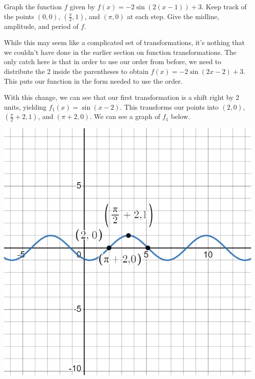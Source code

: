 \documentclass{ximera}
\begin{document}
\begin{example}
Graph the function $f$ given by $f(x) = -2\sin(2(x - 1)) + 3$. Keep track of the points $(0, 0)$, $\left(\frac{\pi}{2}, 1\right)$, and $(\pi, 0)$ at each step. Give the midline, amplitude, and period of $f$. 

\begin{explanation}
While this may seem like a complicated set of transformations, it's nothing that we couldn't have done in the earlier section on function transformations. The only catch here is that in order to use our order from before, we need to distribute the 2 inside the parentheses to obtain $f(x) = -2\sin(2x - 2) + 3$. This puts our function in the form needed to use the order. 

With this change, we can see that our first transformation is a shift right by 2 units, yielding $f_1(x) = \sin(x - 2)$. This transforms our points into $(2, 0)$, $\left(\frac{\pi}{2} + 2, 1 \right)$, and $(\pi + 2, 0)$.  We can see a graph of $f_1$ below.
\begin{image}
\includegraphics[width=0.8\linewidth]{images/graph-2-ex1.png}
\end{image}


\end{explanation}
\end{example}
\end{document}
